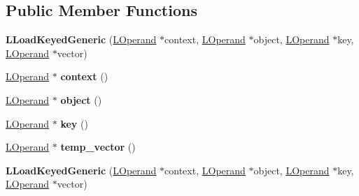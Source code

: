 \subsection*{Public Member Functions}
\begin{DoxyCompactItemize}
\item 
{\bfseries L\+Load\+Keyed\+Generic} (\hyperlink{classv8_1_1internal_1_1_l_operand}{L\+Operand} $\ast$context, \hyperlink{classv8_1_1internal_1_1_l_operand}{L\+Operand} $\ast$object, \hyperlink{classv8_1_1internal_1_1_l_operand}{L\+Operand} $\ast$key, \hyperlink{classv8_1_1internal_1_1_l_operand}{L\+Operand} $\ast$vector)\hypertarget{classv8_1_1internal_1_1_l_load_keyed_generic_a00c3e8047fc556277f4ec4ebc4207cf8}{}\label{classv8_1_1internal_1_1_l_load_keyed_generic_a00c3e8047fc556277f4ec4ebc4207cf8}

\item 
\hyperlink{classv8_1_1internal_1_1_l_operand}{L\+Operand} $\ast$ {\bfseries context} ()\hypertarget{classv8_1_1internal_1_1_l_load_keyed_generic_a522e2bd4a7d1b71a95f891c1fc9a99c8}{}\label{classv8_1_1internal_1_1_l_load_keyed_generic_a522e2bd4a7d1b71a95f891c1fc9a99c8}

\item 
\hyperlink{classv8_1_1internal_1_1_l_operand}{L\+Operand} $\ast$ {\bfseries object} ()\hypertarget{classv8_1_1internal_1_1_l_load_keyed_generic_aadfba9d6286d59cc727bce5ae1b74ee7}{}\label{classv8_1_1internal_1_1_l_load_keyed_generic_aadfba9d6286d59cc727bce5ae1b74ee7}

\item 
\hyperlink{classv8_1_1internal_1_1_l_operand}{L\+Operand} $\ast$ {\bfseries key} ()\hypertarget{classv8_1_1internal_1_1_l_load_keyed_generic_ad55d2217ba38aa46911c0e797a610388}{}\label{classv8_1_1internal_1_1_l_load_keyed_generic_ad55d2217ba38aa46911c0e797a610388}

\item 
\hyperlink{classv8_1_1internal_1_1_l_operand}{L\+Operand} $\ast$ {\bfseries temp\+\_\+vector} ()\hypertarget{classv8_1_1internal_1_1_l_load_keyed_generic_ac529ed41ee727bf1e320ad6711ce2cff}{}\label{classv8_1_1internal_1_1_l_load_keyed_generic_ac529ed41ee727bf1e320ad6711ce2cff}

\item 
{\bfseries L\+Load\+Keyed\+Generic} (\hyperlink{classv8_1_1internal_1_1_l_operand}{L\+Operand} $\ast$context, \hyperlink{classv8_1_1internal_1_1_l_operand}{L\+Operand} $\ast$object, \hyperlink{classv8_1_1internal_1_1_l_operand}{L\+Operand} $\ast$key, \hyperlink{classv8_1_1internal_1_1_l_operand}{L\+Operand} $\ast$vector)\hypertarget{classv8_1_1internal_1_1_l_load_keyed_generic_a00c3e8047fc556277f4ec4ebc4207cf8}{}\label{classv8_1_1internal_1_1_l_load_keyed_generic_a00c3e8047fc556277f4ec4ebc4207cf8}


\end{DoxyCompactItemize}
